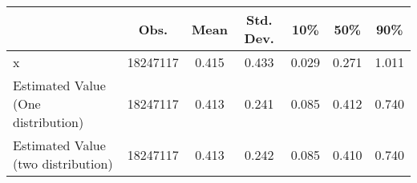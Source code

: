 {
\def\sym#1{\ifmmode^{#1}\else\(^{#1}\)\fi}
\begin{tabular}{l*{1}{cccccc}}
\hline\hline
                    &        Obs.&        Mean&   Std. Dev.&        10\%&        50\%&        90\%\\
\hline
x                   &    18247117&       0.415&       0.433&       0.029&       0.271&       1.011\\
Estimated Value (One distribution)&    18247117&       0.413&       0.241&       0.085&       0.412&       0.740\\
Estimated Value (two distribution)&    18247117&       0.413&       0.242&       0.085&       0.410&       0.740\\
\hline\hline
\end{tabular}
}
